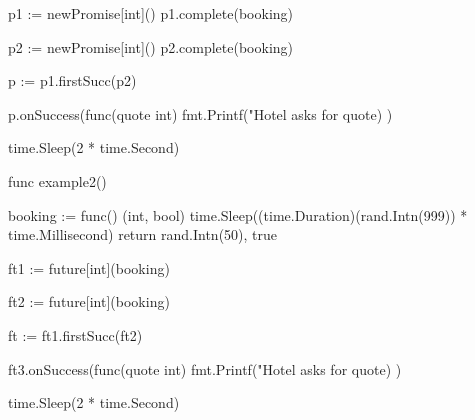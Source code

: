 \documentclass[landscape, a4paper]{article}
\begin{document}
\begin{minipage}[t]{0.2\linewidth}
\begin{betterlist}
{\begin{dnumberedcodebox}[minted language=go,minted options={autogobble, fontsize=\tiny,numbersep=0.3cm,linenos}, box align=top]
{            p1 := newPromise[int]()
            p1.complete(booking)

            p2 := newPromise[int]()
            p2.complete(booking)

            p := p1.firstSucc(p2)

            p.onSuccess(func(quote int) {
                fmt.Printf("Hotel asks for %
                  quote)
            })

            time.Sleep(2 * time.Second)
        }

        func example2() {
            booking := func() (int, bool) {
                time.Sleep((time.Duration)(rand.Intn(999)) 
                  * time.Millisecond)
                return rand.Intn(50), true
            }

            ft1 := future[int](booking)

            ft2 := future[int](booking)

            ft := ft1.firstSucc(ft2)

            ft3.onSuccess(func(quote int) {
                fmt.Printf("Hotel asks for %
                  quote)
            })

            time.Sleep(2 * time.Second)
        }
        \end{dnumberedcodebox}
    }
  \end{betterlist}
\end{minipage}
\end{document}
